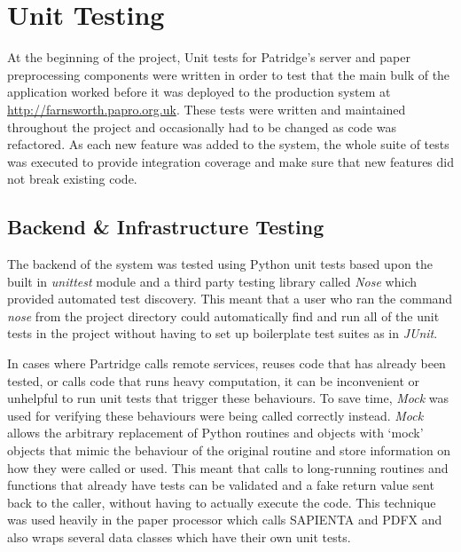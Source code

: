 %  
%

\section{ Unit Testing }

At the beginning of the project, Unit tests for Patridge's server and paper
preprocessing components were written in order to test that the main bulk of
the application worked before it was deployed to the production system at
\url{http://farnsworth.papro.org.uk}. These tests were written and maintained
throughout the project and occasionally had to be changed as code was
refactored. As each new feature was added to the system, the whole suite of
tests was executed to provide integration coverage and make sure that new
features did not break existing code. 

\subsection{ Backend \& Infrastructure Testing}

The backend of the system was tested using Python unit tests based upon the
built in \emph{unittest} module and a third party testing library called
\emph{Nose} which provided automated test discovery. This meant that a user who
ran the command \emph{nose} from the project directory could automatically find
and run all of the unit tests in the project without having to set up
boilerplate test suites as in \emph{JUnit}.

In cases where Partridge calls remote services, reuses code that has already
been tested, or calls code that runs heavy computation, it can be inconvenient
or unhelpful to run unit tests that trigger these behaviours. To save time,
\emph{Mock}\cite{mock2013} was used for verifying these behaviours were being
called correctly instead.  \emph{Mock} allows the arbitrary replacement of Python
routines and objects with `mock' objects that mimic the behaviour of the
original routine and store information on how they were called or used. This
meant that calls to long-running routines and functions that already have tests
can be validated and a fake return value sent back to the caller, without
having to actually execute the code. This technique was used heavily in the
paper processor which calls SAPIENTA and PDFX and also wraps several data
classes which have their own unit tests.



